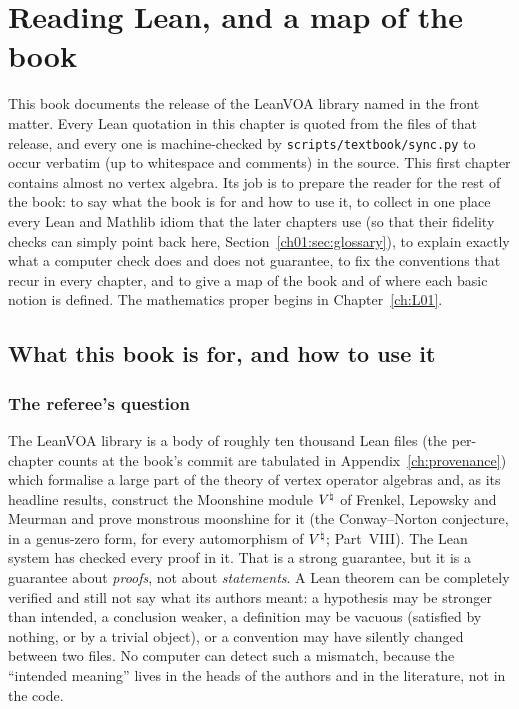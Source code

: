\chapter{Reading Lean, and a map of the book}\label{ch:01}
\begingroup\setlength{\emergencystretch}{3em}

\providecommand{\chonevac}{\mathbf{1}}
\providecommand{\choneV}{\mathcal{V}}

This book documents the release of the LeanVOA library named in the front matter. Every Lean quotation in this chapter is quoted from the files of that
release, and every one is machine-checked by \texttt{scripts/textbook/sync.py} to occur verbatim
(up to whitespace and comments) in the source. This first chapter contains almost no vertex
algebra. Its job is to prepare the reader for the rest of the book: to say what the book is for
and how to use it, to collect in one place every Lean and Mathlib idiom that the later chapters use
(so that their fidelity checks can simply point back here, Section~\ref{ch01:sec:glossary}), to explain exactly what a computer
check does and does not guarantee, to fix the conventions that recur in every chapter, and to give a
map of the book and of where each basic notion is defined. The mathematics proper begins in
Chapter~\ref{ch:L01}.

\section{What this book is for, and how to use it}\label{ch01:sec:purpose}

\subsection{The referee's question}

The LeanVOA library is a body of roughly ten thousand Lean files (the per-chapter counts at the book's commit are tabulated in
Appendix~\ref{ch:provenance})
which formalise a large part of the theory of vertex operator algebras and, as its headline results,
construct the Moonshine module ${V^{\natural}}$ of Frenkel, Lepowsky and Meurman and prove monstrous moonshine for it (the
Conway--Norton conjecture, in a genus-zero form, for every automorphism of ${V^{\natural}}$; Part~VIII). The Lean system has checked
every proof in it. That is a strong guarantee, but it is a guarantee about \emph{proofs}, not about
\emph{statements}. A Lean theorem can be completely verified and still not say what its authors
meant: a hypothesis may be stronger than intended, a conclusion weaker, a definition may be vacuous
(satisfied by nothing, or by a trivial object), or a convention may have silently changed between
two files. No computer can detect such a mismatch, because the ``intended meaning'' lives in the
heads of the authors and in the literature, not in the code.


